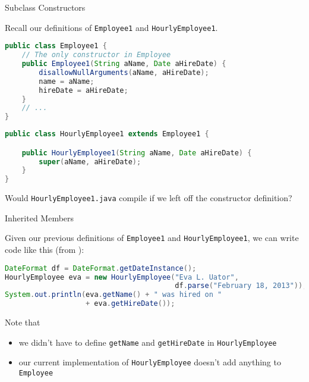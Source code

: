 \documentclass{beamer}
\begin{document}
\begin{frame}[fragile]{Subclass Constructors}


Recall our definitions of {\tt Employee1} and {\tt HourlyEmployee1}.
\begin{lstlisting}[language=Java]
public class Employee1 {
    // The only constructor in Employee
    public Employee1(String aName, Date aHireDate) {
        disallowNullArguments(aName, aHireDate);
        name = aName;
        hireDate = aHireDate;
    }
    // ...
}
\end{lstlisting}

\begin{lstlisting}[language=Java]
public class HourlyEmployee1 extends Employee1 {

    public HourlyEmployee1(String aName, Date aHireDate) {
        super(aName, aHireDate);
    }
}
\end{lstlisting}

Would {\tt HourlyEmployee1.java} compile if we left off the constructor definition?

\end{frame}


\begin{frame}[fragile]{Inherited Members}


Given our previous definitions of {\tt Employee1} and {\tt HourlyEmployee1}, we can write code like this (from ):
\begin{lstlisting}[language=Java]
DateFormat df = DateFormat.getDateInstance();
HourlyEmployee eva = new HourlyEmployee("Eva L. Uator",
                                        df.parse("February 18, 2013"));
System.out.println(eva.getName() + " was hired on "
                   + eva.getHireDate());
\end{lstlisting}
Note that
\begin{itemize}
\item we didn't have to define {\tt getName} and {\tt getHireDate} in {\tt HourlyEmployee}
\item our current implementation of {\tt HourlyEmployee} doesn't add anything to {\tt Employee}
\end{itemize}


\end{frame}
\end{document}
